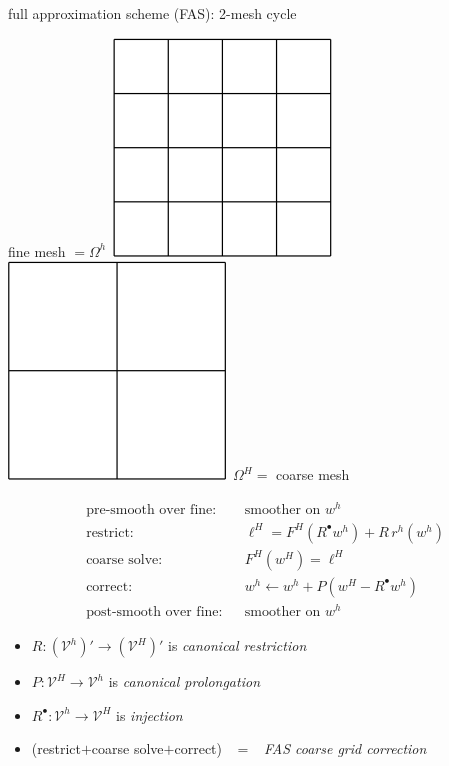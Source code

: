 \documentclass[svgnames,
               hyperref={colorlinks,citecolor=DeepPink4,linkcolor=FireBrick,urlcolor=Maroon},
               usepdftitle=false]  %
               {beamer}
\newcommand{\iR}{R^{\bullet}}
\begin{document}
\begin{frame}{full approximation scheme (FAS): 2-mesh cycle}

\begin{center}
fine mesh $=\Omega^h$\, \includegraphics[height=0.14\textheight]{../talk-oxford/images/fine-grid.png} \hspace{15mm} \includegraphics[height=0.14\textheight]{../talk-oxford/images/coarse-grid.png} \,$\Omega^H=$ coarse mesh
\end{center}

\begin{align*}
&\text{pre-smooth over fine:} & & \text{smoother on } w^h \\
&\text{restrict:}                   & &\ell^H = F^H(\iR w^h) + R\, r^h(w^h) \\
&\text{coarse solve:}               & &F^H(w^H) = \ell^H \\
&\text{correct:}                    & &w^h \leftarrow w^h + P(w^H - \iR w^h) \\
&\text{post-smooth over fine:} & & \text{smoother on } w^h
\end{align*}

\bigskip
{\small
\begin{itemize}
\item $R: (\mathcal{V}^h)' \to (\mathcal{V}^H)'$ is \emph{canonical restriction}
\item $P: \mathcal{V}^H \to \mathcal{V}^h$ is \emph{canonical prolongation}
\item $\iR: \mathcal{V}^h \to \mathcal{V}^H$ is \emph{injection}
\item (restrict$+$coarse solve$+$correct) \, $=$ \, \emph{FAS coarse grid correction}
\end{itemize}
}
\end{frame}
\end{document}
